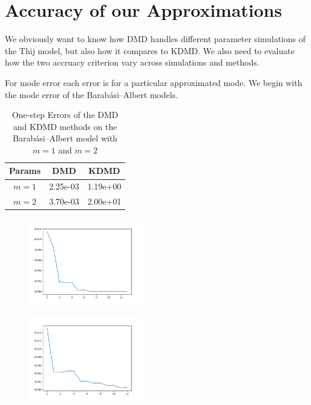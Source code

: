 \FloatBarrier


\section{Accuracy of our Approximations}

We obviously want to know how DMD handles different parameter simulations of the Thij model,
but also how it compares to KDMD. We also need to evaluate how the two accruacy criterion vary across
simulations and methods. 

For mode error each error is for a particular approximated mode. We begin with the mode error of the 
Barabási–Albert models.

\begin{table}
    \centering
    \begin{tabular}{||c c c ||} 
    \hline
    Params & DMD & KDMD  \\ [0.5ex] 
    \hline\hline
    $m=1$ & 2.25e-03 &  1.19e+00\\ 
    \hline
    $m=2$ & 3.70e-03 & 2.00e+01 \\
    \hline
   \end{tabular}
   \caption{One-step Errors of the DMD and KDMD methods on the Barabási–Albert model with $m=1$ and $m=2$}
   \label{table:15}
\end{table}

\begin{figure}
    \includegraphics[width=5cm]{Images/mode_error_dmd_prefattach1.png}
    \centering
\end{figure}

\begin{figure}
    \includegraphics[width=5cm]{Images/mode_error_kdmd_prefattach1.png}
    \centering
\end{figure}

